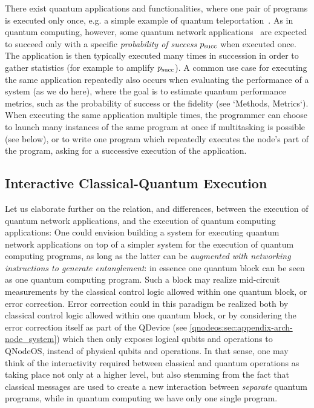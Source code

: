 There exist quantum applications and functionalities, where one pair of programs is executed only once, e.g. a simple example of quantum teleportation~\cite{bennett_1993_teleportation}. As in quantum computing, however, some quantum network applications~\cite{wehner_2018_stages} are expected to succeed only with a specific \emph{probability of success} $p_{\rm succ}$ when executed once. The application is then typically executed many times in succession in order to gather statistics (for example to amplify $p_{\rm succ}$). A common use case for executing the same application repeatedly also occurs when evaluating the performance of a system (as we do here), where the goal is to estimate quantum performance metrics, such as the probability of success or the fidelity (see `Methods, Metrics`).
When executing the same application multiple times, the programmer can choose to launch many instances of the same program at once if multitasking is possible (see below), or to write one program which repeatedly executes the node's part of the program, asking for a successive execution of the application.

\subsection{Interactive Classical-Quantum Execution}

Let us elaborate further on the relation, and differences, between the execution of quantum network applications, and the execution of quantum computing applications: One could envision building a system for executing quantum network applications on top of a simpler system for the execution of quantum computing programs, as long as the latter can be \emph{augmented with networking instructions to generate entanglement}: in essence one quantum block can be seen as one quantum computing program. Such a block may realize mid-circuit measurements by the classical control logic allowed within one quantum block, or error correction. Error correction could in this paradigm be realized both by classical control logic allowed within one quantum block, or by considering the error correction itself as part of the \ac{QDevice} (see \cref{qnodeos:sec:appendix-arch-node_system}) which then only exposes logical qubits and operations to \ac{QNodeOS}, instead of physical qubits and operations. In that sense, one may think of the interactivity required between classical and quantum operations as taking place not only at a higher level, but also stemming from the fact that classical messages are used to create a new interaction between \emph{separate} quantum programs, while in quantum computing we have only one single program.

